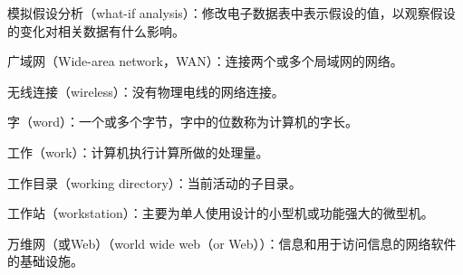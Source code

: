 模拟假设分析（what-if analysis）：修改电子数据表中表示假设的值，以观察假设的变化对相关数据有什么影响。

广域网（Wide-area network，WAN）：连接两个或多个局域网的网络。

无线连接（wireless）：没有物理电线的网络连接。

字（word）：一个或多个字节，字中的位数称为计算机的字长。

工作（work）：计算机执行计算所做的处理量。

工作目录（working directory）：当前活动的子目录。

工作站（workstation）：主要为单人使用设计的小型机或功能强大的微型机。

万维网（或Web）（world wide web（or Web））：信息和用于访问信息的网络软件的基础设施。


